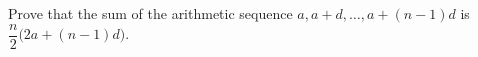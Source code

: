 Prove that the sum of the arithmetic sequence $a,a+d,\dots,a+(n-1)d$ is $\dfrac n2\big(2a+(n-1)d\big)$.
